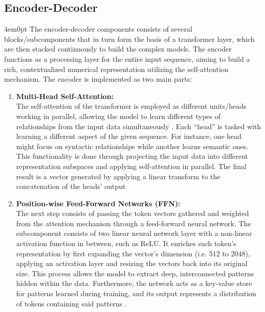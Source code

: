 	\subsection{Encoder-Decoder}
		\begin{indentedblock}{4em}{0pt}
			The encoder-decoder components consists of several blocks/subcomponents that in turn form the basis of a transformer layer, which are then stacked continuously to build the complex models. The encoder functions as a processing layer for the entire input sequence, aiming to build a rich, contextualized numerical representation utilizing the self-attention mechanism. The encoder is implemented as two main parts:
			\begin{enumerate}
				\item {
					\textbf{Multi-Head Self-Attention:} \\
					The self-attention of the transformer is employed as different units/heads working in parallel, allowing the model to learn different types of relationships from the input data simultaneously \parencite{multi_head_self_attention_voita}. Each ``head'' is tasked with learning a different aspect of the given sequence. For instance, one head might focus on syntactic relationships while another learns semantic ones. This functionality is done through projecting the input data into different representation subspaces and applying self-attention in parallel. The final result is a vector generated by applying a linear transform to the concatenation of the heads' output \parencite{attention_is_all_you_need_vaswani}
				}
				\item {
					\textbf{Position-wise Feed-Forward Networks (FFN):} \\
					The next step consists of passing the token vectors gathered and weighted from the attention mechanism through a feed-forward neural network. The subcomponent consists of two linear neural network layer with a non-linear activation function in between, such as ReLU. It enriches each token's representation by first expanding the vector's dimension (i.e. 512 to 2048), applying an activation layer and resizing the vectors back into its original size. This process allows the model to extract deep, interconnected patterns hidden within the data. Furthermore, the network acts as a key-value store for patterns learned during training, and its output represents a distribution of tokens containing said patterns \parencite{ffn_geva}.
				}
			\end{enumerate}
			

\end{indentedblock}
